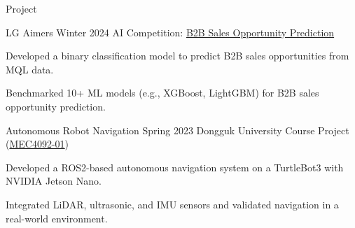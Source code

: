 \begin{rSection}{Project}
  \begin{rSubsection}
    {LG Aimers}
    {Winter 2024}
    {AI Competition: \href{https://lgaimers.ai/}{B2B Sales Opportunity Prediction}}
    {}
    \item Developed a binary classification model to predict B2B sales opportunities from MQL data.
    \item Benchmarked 10+ ML models (e.g., XGBoost, LightGBM) for B2B sales opportunity prediction.
  \end{rSubsection}

  \begin{rSubsection}
    {Autonomous Robot Navigation}
    {Spring 2023}
    {Dongguk University Course Project (\href{https://mecha.dongguk.edu/page/576}{MEC4092-01})}
    {}
    \item Developed a ROS2-based autonomous navigation system on a TurtleBot3 with NVIDIA Jetson Nano.
    \item Integrated LiDAR, ultrasonic, and IMU sensors and validated navigation in a real-world environment.
  \end{rSubsection}
\end{rSection}
